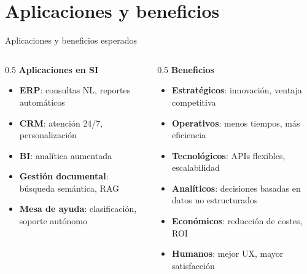 \documentclass[10pt,aspectratio=169]{beamer}
\begin{document}
\section{Aplicaciones y beneficios}
\begin{frame}{Aplicaciones y beneficios esperados}
    \begin{columns}[T]
        \begin{column}{0.5\textwidth}
            \textbf{\textcolor{azulPrincipal}{Aplicaciones en SI}}
            \begin{itemize}
                \item \textbf{ERP}: consultas NL, reportes automáticos
                \item \textbf{CRM}: atención 24/7, personalización
                \item \textbf{BI}: analítica aumentada
                \item \textbf{Gestión documental}: búsqueda semántica, RAG
                \item \textbf{Mesa de ayuda}: clasificación, soporte autónomo
            \end{itemize}
        \end{column}
        \begin{column}{0.5\textwidth}
            \textbf{\textcolor{azulPrincipal}{Beneficios}}
            \begin{itemize}
                \item \textbf{Estratégicos}: innovación, ventaja competitiva
                \item \textbf{Operativos}: menos tiempos, más eficiencia
                \item \textbf{Tecnológicos}: APIs flexibles, escalabilidad
                \item \textbf{Analíticos}: decisiones basadas en datos no estructurados
                \item \textbf{Económicos}: reducción de costes, ROI
                \item \textbf{Humanos}: mejor UX, mayor satisfacción
            \end{itemize}
        \end{column}
    \end{columns}
\end{frame}

\end{document}

